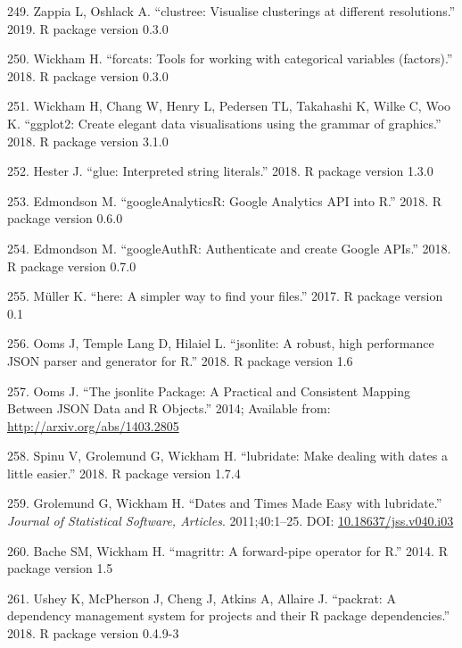 \documentclass[11pt,a4paper,titlepage,twoside,openright]{style/unimelbthesis}
\theoremstyle{definition}
\theoremstyle{definition}
\theoremstyle{definition}
\theoremstyle{remark}
\begin{document}
\begin{mainmatter}
\leavevmode\hypertarget{ref-R-clustree}{}%
249. Zappia L, Oshlack A. ``clustree: Visualise clusterings at different resolutions.'' 2019. R package version 0.3.0

\leavevmode\hypertarget{ref-R-forcats}{}%
250. Wickham H. ``forcats: Tools for working with categorical variables (factors).'' 2018. R package version 0.3.0

\leavevmode\hypertarget{ref-R-ggplot2}{}%
251. Wickham H, Chang W, Henry L, Pedersen TL, Takahashi K, Wilke C, Woo K. ``ggplot2: Create elegant data visualisations using the grammar of graphics.'' 2018. R package version 3.1.0

\leavevmode\hypertarget{ref-R-glue}{}%
252. Hester J. ``glue: Interpreted string literals.'' 2018. R package version 1.3.0

\leavevmode\hypertarget{ref-R-googleAnalyticsR}{}%
253. Edmondson M. ``googleAnalyticsR: Google Analytics API into R.'' 2018. R package version 0.6.0

\leavevmode\hypertarget{ref-R-googleAuthR}{}%
254. Edmondson M. ``googleAuthR: Authenticate and create Google APIs.'' 2018. R package version 0.7.0

\leavevmode\hypertarget{ref-R-here}{}%
255. Müller K. ``here: A simpler way to find your files.'' 2017. R package version 0.1

\leavevmode\hypertarget{ref-R-jsonlite}{}%
256. Ooms J, Temple Lang D, Hilaiel L. ``jsonlite: A robust, high performance JSON parser and generator for R.'' 2018. R package version 1.6

\leavevmode\hypertarget{ref-Ooms2014-ay}{}%
257. Ooms J. ``The jsonlite Package: A Practical and Consistent Mapping Between JSON Data and R Objects.'' 2014; Available from: \url{http://arxiv.org/abs/1403.2805}

\leavevmode\hypertarget{ref-R-lubridate}{}%
258. Spinu V, Grolemund G, Wickham H. ``lubridate: Make dealing with dates a little easier.'' 2018. R package version 1.7.4

\leavevmode\hypertarget{ref-Grolemund2011-qn}{}%
259. Grolemund G, Wickham H. ``Dates and Times Made Easy with lubridate.'' \emph{Journal of Statistical Software, Articles}. 2011;40:1--25. DOI: \href{https://doi.org/10.18637/jss.v040.i03}{10.18637/jss.v040.i03}

\leavevmode\hypertarget{ref-R-magrittr}{}%
260. Bache SM, Wickham H. ``magrittr: A forward-pipe operator for R.'' 2014. R package version 1.5

\leavevmode\hypertarget{ref-R-packrat}{}%
261. Ushey K, McPherson J, Cheng J, Atkins A, Allaire J. ``packrat: A dependency management system for projects and their R package dependencies.'' 2018. R package version 0.4.9-3


\end{mainmatter}
\end{document}
